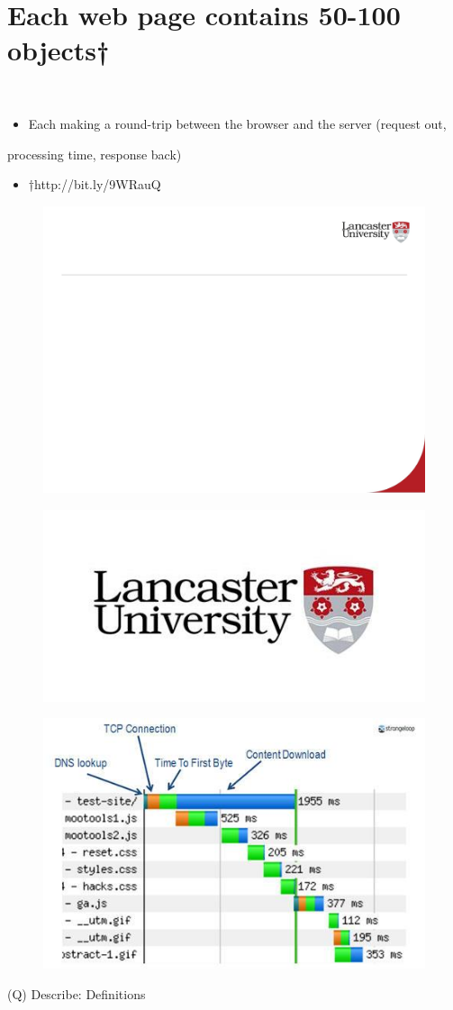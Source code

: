 \documentclass[12pt]{article}
\begin{document}
\section{Each web page contains 50-100 objects†}
\\
\begin{itemize}
  \item Each making a round-trip between the browser and the server (request out, 
\end{itemize}
processing time, response back)\\
\begin{itemize}
  \item †http://bit.ly/9WRauQ
\end{itemize}
\begin{figure}[H]
\includegraphics[width=0.5\linewidth]{page38-image-1.png}
\end{figure}
\begin{figure}[H]
\includegraphics[width=0.5\linewidth]{page38-image-2.png}
\end{figure}
\begin{figure}[H]
\includegraphics[width=0.5\linewidth]{page38-image-3.png}
\end{figure}
\clearpage
(Q)
Describe: Definitions
\clearpage
\end{document}
